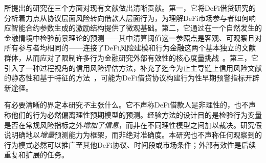 所提出的研究在三个方面对现有文献做出清晰贡献。第一，它将DeFi借贷研究的分析着力点从协议层面风险转向借款人层面行为，为理解DeFi市场参与者如何响应智能合约参数生成的激励结构提供了微观基础。第二，它通过在一个自然发生的金融情境中检验前景理论的预测——其中清算阈值这一参照点是客观、可观察且对所有参与者均相同的——连接了DeFi风险建模和行为金融这两个基本独立的文献群体，从而应对了限制许多行为金融研究外部有效性的核心度量挑战~\cite{barberis2013thirty}。第三，它引入了一种过程视角的信用风险评估方法，补充了迄今为止主导链上信用风险文献的静态性和基于特征的方法~\cite{ghosh2024onchain}，可能为DeFi借贷协议构建行为性早期预警指标开辟新途径。

有必要清晰的界定本研究\emph{不}主张什么。它不声称DeFi借款人是非理性的，也不声称他们的行为必然偏离理性预期模型的预测。经验方法的设计目的是检验行为变量是否在常规风险指标之外\emph{增加了信息}，而非在不同理性模型之间加以裁决。研究假说明确地以\emph{增量}预测能力为框架，而非绝对准确度。本研究也不声称任何观察到的行为模式必然可以推广至其他DeFi协议、时间段或市场条件；外部有效性是后续重复和扩展的任务。


\vspace{4pt}

